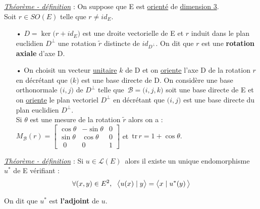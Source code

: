 \underline{\emph{Théorème - définition}} : On suppose que E est \underline{orienté} de \underline{dimension 3}.\vspace{0.1cm}\\
Soit \(r\in SO(E)\) telle que \(r\neq id_E.\)
\begin{itemize}[leftmargin=1cm]
    \item[•] \(D= \ker \bigl(r+id_E \bigr)\) est une droite vectorielle de E et $r$ induit dans le plan euclidien \(D^\bot\) une rotation $\tilde{r}$ distincte de $id_{D^\bot}$. On dit que $r$ est une \textbf{rotation axiale} d'axe D.\vspace{0.2cm}
    
    \item[•] On choisit un vecteur \underline{unitaire} $k$ de D et on \underline{oriente} l'axe D de la rotation $r$ en décrétant que $\bigl(k\bigr)$ est une base directe de D. On considère une base orthonormale $\bigl(i,j\bigr)$ de $D^\bot$ telle que \(\,\mathcal{B}=\bigl(i,j,k\bigr)\) soit une base directe de E et on \underline{oriente} le plan vectoriel $D^\bot$ en décrétant que $\bigl(i,j\bigr)$ est une base directe du plan euclidien $D^\bot$.\\
    Si $\theta$ est une mesure de la rotation $\tilde{r}$ alors on a : \(M_\mathcal{B}(r)=\left[
        \begin{array}{lrc}
            \cos \theta & -\sin \theta & 0 \\
            \sin \theta & \cos \theta & 0 \\
            \ \; 0 & 0 \ \; & 1
        \end{array}
    \right] \) et \(\, \text{tr}\,r=1+\cos \theta.\)
\end{itemize}

\vspace{1cm}

\underline{\emph{Théorème - définition}} : Si \(u \in \mathscr{L}(E)\,\) alors il existe un unique endomorphisme $u^*$ de E vérifiant :\vspace{-0.4cm} \[\forall(x,y)\in E^2,\ \; \bigl\langle u(x)\mid y \bigr\rangle=\bigl\langle x\mid u^*(y)\, \bigr\rangle\]

\vspace{-0.2cm}
On dit que $u^*$ est \textbf{l'adjoint} de $u$.



\vspace{2cm}
